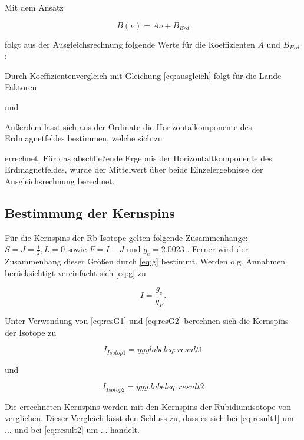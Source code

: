 Mit dem Ansatz

\begin{equation}
B(\nu) = A\nu + B_{Erd}
\end{equation}

folgt aus der Ausgleichsrechnung folgende Werte für die Koeffizienten $A$ und $B_{Erd}$:



Durch Koeffizientenvergleich mit Gleichung \ref{eq:ausgleich} folgt für die Lande Faktoren



und



Außerdem lässt sich aus der Ordinate die Horizontalkomponente des Erdmagnetfeldes bestimmen,
welche sich zu



errechnet. Für das abschließende Ergebnis der Horizontaltkomponente des Erdmagnetfeldes, wurde der Mittelwert über beide Einzelergebnisse der Ausgleichsrechnung berechnet.

\subsection{Bestimmung der Kernspins}
Für die Kernspins der Rb-Isotope gelten folgende Zusammenhänge: $S = J = \frac{1}{2} , L = 0$ sowie $F = I - J$ und $g_e = 2.0023$ \cite{landeE-}. Ferner wird
der Zusammenhang dieser Größen durch \ref{eq:g} bestimmt. Werden o.g. Annahmen berücksichtigt vereinfacht sich \ref{eq:g} zu

\begin{equation}
I = \frac{g_e}{g_F}.
\end{equation}

Unter Verwendung von \ref{eq:resG1} und \ref{eq:resG2} berechnen sich die Kernspins der Isotope zu

\begin{equation}
I_{Isotop1} = yyy
label{eq:result1}
\end{equation}

und

\begin{equation}
I_{Isotop2} = yyy.
label{eq:result2}
\end{equation}

Die errechneten Kernspins werden mit den Kernspins der Rubidiumisotope von \cite{coreSpin} verglichen. Dieser Vergleich lässt den Schluss zu,
dass es sich bei \ref{eq:result1} um ... und bei \ref{eq:result2} um ... handelt.

